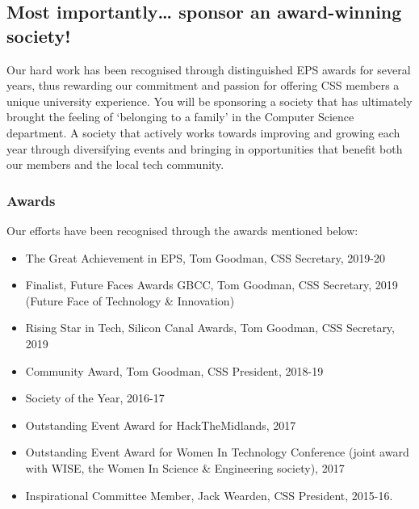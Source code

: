 \documentclass{article}
\begin{document}
\vspace{-0.75cm}

\subsection*{Most importantly… sponsor an award-winning society!}

Our hard work has been recognised through distinguished EPS awards for several years, thus rewarding our commitment and passion for offering CSS members a unique university experience.
You will be sponsoring a society that has ultimately brought the feeling of ‘belonging to a family’ in the Computer Science department.
A society that actively works towards improving and growing each year through diversifying events and bringing in opportunities that benefit both our members and the local tech community.

\newpage

\subsubsection*{Awards}

\noindent Our efforts have been recognised through the awards mentioned below:

\begin{itemize}
  \item The Great Achievement in EPS, Tom Goodman, CSS Secretary, 2019-20
  \item Finalist, Future Faces Awards GBCC, Tom Goodman, CSS Secretary, 2019 (Future Face of Technology \& Innovation)
  \item Rising Star in Tech, Silicon Canal Awards, Tom Goodman, CSS Secretary, 2019
  \item Community Award, Tom Goodman, CSS President, 2018-19
  \item Society of the Year, 2016-17
  \item Outstanding Event Award for HackTheMidlands, 2017
  \item Outstanding Event Award for Women In Technology Conference (joint award with WISE, the Women In Science \& Engineering society), 2017
  \item Inspirational Committee Member, Jack Wearden, CSS President, 2015-16.
\end{itemize}

\medskip
\end{document}
